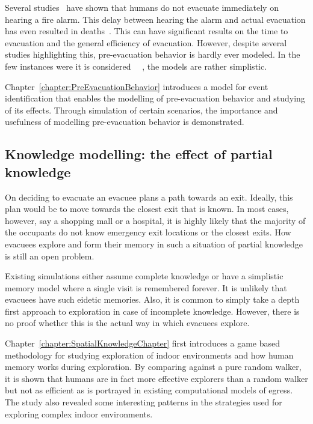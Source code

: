 
    Several studies~\cite{Kuligowski:2009un} have shown that humans do not evacuate immediately on hearing a fire alarm. This delay between hearing the alarm and actual evacuation has even resulted in deaths~\cite{Berry:2000us}. This can have significant results on the time to evacuation and the general efficiency of evacuation. However, despite several studies highlighting this, pre-evacuation behavior is hardly ever modeled. In the few instances were it is considered~~\cite{Pires:2005gs,Franca:2009el} , the models are rather simplistic.

    Chapter~\ref{chapter:PreEvacuationBehavior} introduces a model for event identification that enables the modelling of pre-evacuation behavior and studying of its effects. Through simulation of certain scenarios, the importance and usefulness of modelling pre-evacuation behavior is demonstrated.


\subsection{Knowledge modelling: the effect of partial knowledge}
\label{IBEVAC:EnvironmentKnowledgeShortcomings}

    On deciding to evacuate an evacuee plans a path towards an exit. Ideally, this plan would be to move towards the closest exit that is known. In most cases, however, say a shopping mall or a hospital, it is highly likely that the majority of the occupants do not know emergency exit locations or the closest exits. How evacuees explore and form their memory in such a situation of partial knowledge is still an open problem.

    Existing simulations either assume complete knowledge or have a simplistic memory model where a single visit is remembered forever. It is unlikely that evacuees have such eidetic memories. Also, it is common to simply take a depth first approach to exploration in case of incomplete knowledge. However, there is no proof whether this is the actual way in which evacuees explore.

    Chapter~\ref{chapter:SpatialKnowledgeChapter} first introduces a game based methodology for studying exploration of indoor environments and how human memory works during exploration. By comparing against a pure random walker, it is shown that humans are in fact more effective explorers than a random walker but not as efficient as is portrayed in existing computational models of egress. The study also revealed some interesting patterns in the strategies used for exploring complex indoor environments.


